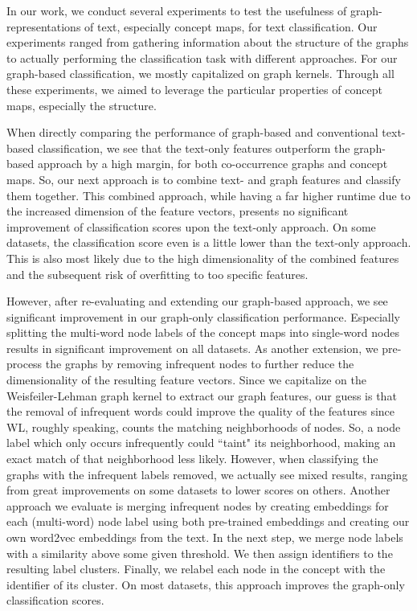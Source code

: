 In our work, we conduct several experiments to test the usefulness of graph-representations of text, especially concept maps, for text classification.
Our experiments ranged from gathering information about the structure of the graphs to actually performing the classification task with different approaches.
For our graph-based classification, we mostly capitalized on graph kernels.
Through all these experiments, we aimed to leverage the particular properties of concept maps, especially the structure.

When directly comparing the performance of graph-based and conventional text-based classification, we see that the text-only features outperform the graph-based approach by a high margin, for both co-occurrence graphs and concept maps.
So, our next approach is to combine text- and graph features and classify them together.
This combined approach, while having a far higher runtime due to the increased dimension of the feature vectors, presents no significant improvement of classification scores upon the text-only approach.
On some datasets, the classification score even is a little lower than the text-only approach.
This is also most likely due to the high dimensionality of the combined features and the subsequent risk of overfitting to too specific features.

However, after re-evaluating and extending our graph-based approach, we see significant improvement in our graph-only classification performance.
Especially splitting the multi-word node labels of the concept maps into single-word nodes results in significant improvement on all datasets.
As another extension, we pre-process the graphs by removing infrequent nodes to further reduce the dimensionality of the resulting feature vectors.
Since we capitalize on the Weisfeiler-Lehman graph kernel to extract our graph features, our guess is that the removal of infrequent words could improve the quality of the features since WL, roughly speaking, counts the matching neighborhoods of nodes.
So, a node label which only occurs infrequently could ``taint" its neighborhood, making an exact match of that neighborhood less likely.
However, when classifying the graphs with the infrequent labels removed, we actually see mixed results, ranging from great improvements on some datasets to lower scores on others.
Another approach we evaluate is merging infrequent nodes by creating embeddings for each (multi-word) node label using both pre-trained embeddings and creating our own word2vec embeddings from the text.
In the next step, we merge node labels with a similarity above some given threshold.
We then assign identifiers to the resulting label clusters.
Finally, we relabel each node in the concept with the identifier of its cluster.
On most datasets, this approach improves the graph-only classification scores.


